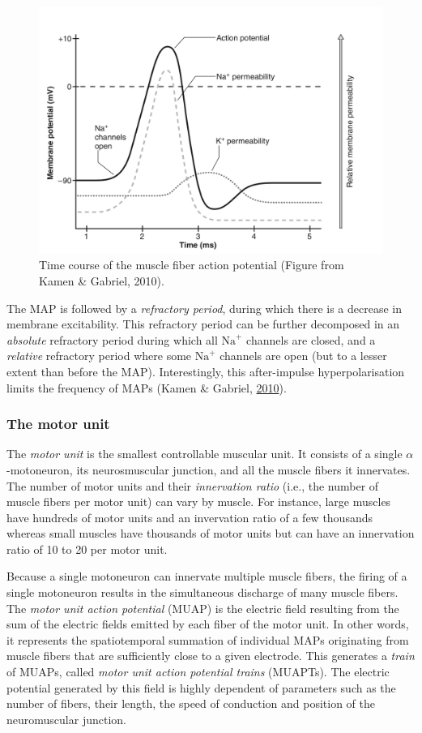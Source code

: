 \documentclass[a4paper,12pt,twoside,openright,oldfontcommands]{memoir}
\begin{document}
\begin{figure}[H]

{\centering \includegraphics[width=0.75\linewidth]{assets/mfap} 

}

\caption{Time course of the muscle fiber action potential (Figure from Kamen \& Gabriel, 2010).}\label{fig:mfap}
\end{figure}

The MAP is followed by a \emph{refractory period}, during which there is
a decrease in membrane excitability. This refractory period can be
further decomposed in an \emph{absolute} refractory period during which
all \(\text{Na}^{+}\) channels are closed, and a \emph{relative}
refractory period where some \(\text{Na}^{+}\) channels are open (but to
a lesser extent than before the MAP). Interestingly, this after-impulse
hyperpolarisation limits the frequency of MAPs (Kamen \& Gabriel,
\protect\hyperlink{ref-kamen_essentials_2010}{2010}).

\subsubsection{The motor unit}\label{the-motor-unit}

The \emph{motor unit} is the smallest controllable muscular unit. It
consists of a single \(\alpha\)-motoneuron, its neurosmuscular junction,
and all the muscle fibers it innervates. The number of motor units and
their \emph{innervation ratio} (i.e., the number of muscle fibers per
motor unit) can vary by muscle. For instance, large muscles have
hundreds of motor units and an invervation ratio of a few thousands
whereas small muscles have thousands of motor units but can have an
innervation ratio of 10 to 20 per motor unit.

Because a single motoneuron can innervate multiple muscle fibers, the
firing of a single motoneuron results in the simultaneous discharge of
many muscle fibers. The \emph{motor unit action potential} (MUAP) is the
electric field resulting from the sum of the electric fields emitted by
each fiber of the motor unit. In other words, it represents the
spatiotemporal summation of individual MAPs originating from muscle
fibers that are sufficiently close to a given electrode. This generates
a \emph{train} of MUAPs, called \emph{motor unit action potential
trains} (MUAPTs). The electric potential generated by this field is
highly dependent of parameters such as the number of fibers, their
length, the speed of conduction and position of the neuromuscular
junction.
\end{document}
